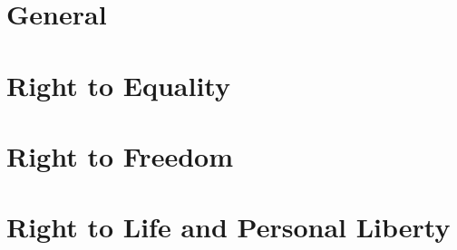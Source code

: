 

\section*{General}



\section*{Right to Equality}



\section*{Right to Freedom}


\section*{Right to Life and Personal Liberty}

